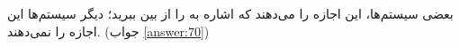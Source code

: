 \section{}
\paragraph{}\label{hint:264}
بعضی سیستم‌ها، این اجازه را می‌دهند که اشاره به  را از بین ببرید؛ دیگر سیستم‌ها این اجازه را نمی‌دهند. (جواب \ref{answer:70})